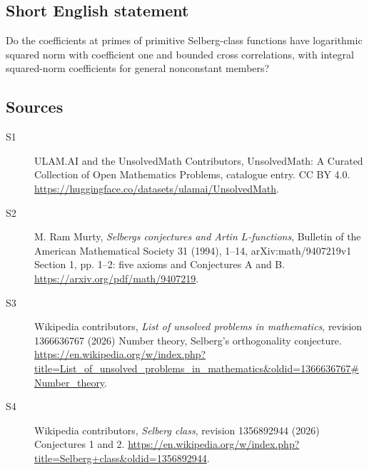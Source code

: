 \documentclass[11pt]{article}
\begin{document}
\subsection{Short English statement}
Do the coefficients at primes of primitive Selberg-class functions have logarithmic squared norm with coefficient one and bounded cross correlations, with integral squared-norm coefficients for general nonconstant members?
\subsection{Sources}
\begin{description}
\item[\hypertarget{source:statement:1}{S1}] ULAM.AI and the UnsolvedMath Contributors, UnsolvedMath: A Curated Collection of Open Mathematics Problems, catalogue entry. CC BY 4.0. \url{https://huggingface.co/datasets/ulamai/UnsolvedMath}.
\item[\hypertarget{source:statement:2}{S2}] M. Ram Murty, \emph{Selberg\textquotesingle s conjectures and Artin $L$-functions}, Bulletin of the American Mathematical Society 31 (1994), 1--14, arXiv:math/9407219v1 Section 1, pp. 1--2: five axioms and Conjectures A and B. \url{https://arxiv.org/pdf/math/9407219}.
\item[\hypertarget{source:statement:3}{S3}] Wikipedia contributors, \emph{List of unsolved problems in mathematics}, revision 1366636767 (2026) Number theory, Selberg's orthogonality conjecture. \url{https://en.wikipedia.org/w/index.php?title=List_of_unsolved_problems_in_mathematics&oldid=1366636767#Number_theory}.
\item[\hypertarget{source:statement:4}{S4}] Wikipedia contributors, \emph{Selberg class}, revision 1356892944 (2026) Conjectures 1 and 2. \url{https://en.wikipedia.org/w/index.php?title=Selberg+class&oldid=1356892944}.
\end{description}
\label{end:statement}
\end{document}
